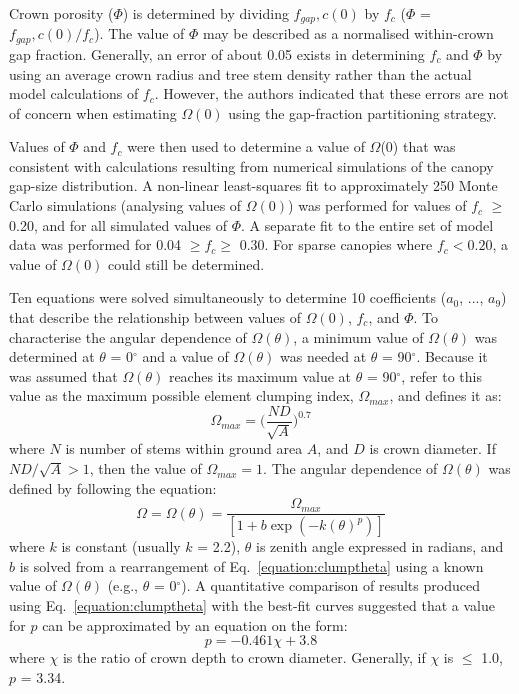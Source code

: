 Crown porosity ($\Phi$) is determined by dividing $f_{gap},c(0)$ by $f_c$ ($\Phi$ = $f_{gap},c(0)/f_c$). The value of $\Phi$ may be described as a normalised within-crown gap fraction. Generally, an error of about 0.05 exists in determining $f_c$ and $\Phi$ by using an average crown radius and tree stem density rather than the actual model calculations of $f_c$. However, the authors indicated that these errors are not of concern when estimating $\Omega(0)$ using the gap-fraction partitioning strategy.

Values of $\Phi$ and $f_c$ were then used to determine a value of $\Omega$(0) that was consistent with calculations resulting from numerical simulations of the canopy gap-size distribution. A non-linear least-squares fit to approximately 250 Monte Carlo simulations (analysing values of $\Omega(0)$) was performed for values of $f_c$ $\geq$ 0.20, and for all simulated values of $\Phi$. A separate fit to the entire set of model data was performed for 0.04 $\geq f_c \geq$ 0.30. For sparse canopies where $f_c < 0.20$, a value of $\Omega(0)$ could still be determined. 

Ten equations were solved simultaneously to determine 10 coefficients ($a_0$, ..., $a_9$) that describe the relationship between values of $\Omega(0)$, $f_c$, and $\Phi$. To characterise the angular dependence of $\Omega(\theta)$, a minimum value of $\Omega(\theta)$ was determined at $\theta$ = 0$^{\circ}$ and a value of $\Omega(\theta)$ was needed at $\theta$ = 90$^{\circ}$. Because it was assumed that $\Omega(\theta)$ reaches its maximum value at $\theta$ = 90$^{\circ}$, \citet{Kucharik1999} refer to this value as the maximum possible element clumping index, $\Omega_{max}$, and defines it as:
\begin{equation}
\Omega_{max} = \Big(\frac{ND}{\sqrt{A}}\Big)^{0.7}
\label{equation:clumpmax}
\end{equation}
\noindent where $N$ is number of stems within ground area $A$, and $D$ is crown diameter. If $ND/\sqrt{A} > 1$, then the value of $\Omega_{max} = 1$. The angular dependence of $\Omega(\theta)$ was defined by \citet{Kucharik1999} following the equation: 
\begin{equation}
\Omega = \Omega(\theta) = \frac{\Omega_{max}}{[1 + b\exp(-k(\theta)^p)]}
\end{equation}\label{equation:clumptheta}
\noindent where $k$ is constant (usually $k$ = 2.2), $\theta$ is zenith angle expressed in radians, and $b$ is solved from a rearrangement of Eq.~\ref{equation:clumptheta} using a known value of $\Omega(\theta)$ (e.g., $\theta$ = 0$^{\circ}$). A quantitative comparison of results produced using Eq.~\ref{equation:clumptheta} with the best-fit curves suggested that a value for $p$ can be approximated by an equation on the form:
\begin{equation}
p = -0.461\chi + 3.8
\label{equation:pchi}
\end{equation}
\noindent where $\chi$ is the ratio of crown depth to crown diameter. Generally, if $\chi$ is $\leq$ 1.0, $p$ = 3.34. 

